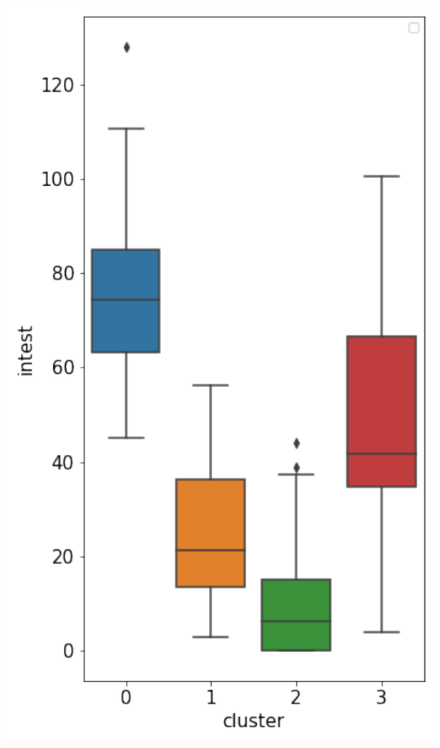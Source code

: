 \documentclass[a4paper,12pt]{ltjsreport}
\begin{document}
\begin{figure}[tbp]
\begin{minipage}[b]{0.32\linewidth}
    \includegraphics[keepaspectratio, scale=0.35]{intest.pdf}
    \label{fig:intest}
  \end{minipage}
  \begin{minipage}[b]{0.32\linewidth}
    \centering

\end{minipage}
\end{figure}
\end{document}
